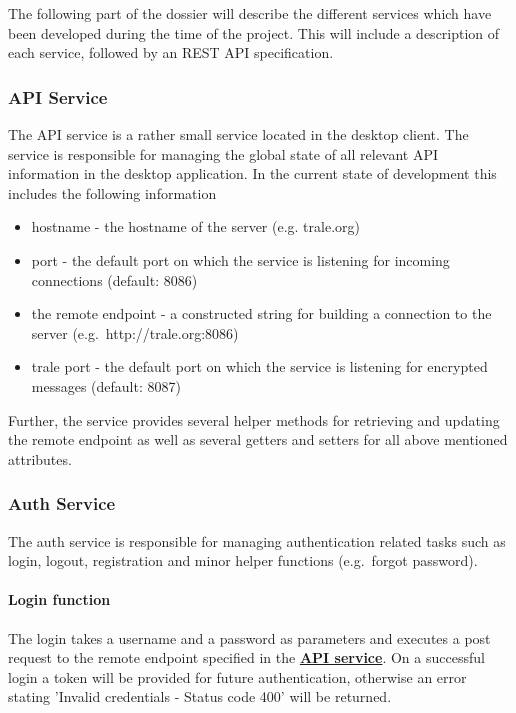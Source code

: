 The following part of the dossier will describe the different services which have been developed during the time of the project.
This will include a description of each service, followed by an REST API specification.

\subsubsection{API Service}\label{subsubsec:api-service}

The API service is a rather small service located in the desktop client.
The service is responsible for managing the global state of all relevant API information in the desktop application.
In the current state of development this includes the following information

\begin{itemize}
    \item hostname - the hostname of the server (e.g. trale.org)
    \item port - the default port on which the service is listening for incoming connections (default: 8086)
    \item the remote endpoint - a constructed string for building a connection to the server (e.g.\ http://trale.org:8086)
    \item trale port - the default port on which the service is listening for encrypted messages (default: 8087)
\end{itemize}

Further, the service provides several helper methods for retrieving and updating the remote endpoint as well as several
getters and setters for all above mentioned attributes.

\subsubsection{Auth Service}\label{subsubsec:auth-service}
The auth service is responsible for managing authentication related tasks such as login, logout, registration and
minor helper functions (e.g.\ forgot password).

\paragraph{Login function}
The login takes a username and a password as parameters and executes a post request to the remote endpoint specified in
the \textbf{\hyperref[subsubsec:api-service]{API service}}.
On a successful login a token will be provided for future authentication, otherwise an error stating 'Invalid
credentials - Status code 400' will be returned.

